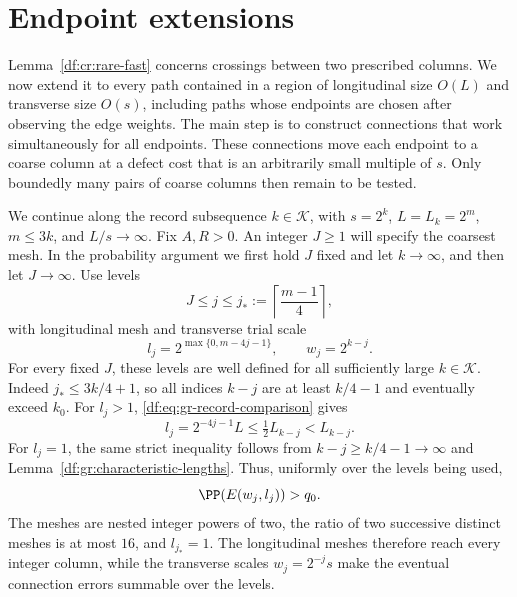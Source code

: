 \section{Endpoint extensions}\label{df:sec:grids}

Lemma~\ref{df:cr:rare-fast} concerns crossings between two prescribed
columns. We now extend it to every path contained in a region of
longitudinal size $O(L)$ and transverse size $O(s)$, including paths
whose endpoints are chosen after observing the edge weights. The main
step is to construct connections that work simultaneously for all
endpoints. These connections move each endpoint to a coarse column at
a defect cost that is an arbitrarily small multiple of $s$. Only
boundedly many pairs of coarse columns then remain to be tested.

We continue along the record subsequence $k\in\mathcal K$, with
$s=2^k$, $L=L_k=2^m$, $m\le3k$, and $L/s\to\infty$. Fix $A,R>0$.
An integer $J\ge1$ will specify the coarsest mesh. In the probability
argument we first hold $J$ fixed and let $k\to\infty$, and then let
$J\to\infty$. Use levels
\[
 J\leq j\leq j_*:=\left\lceil\frac{m-1}{4}\right\rceil,
\]
with longitudinal mesh and transverse trial scale
\begin{equation}\label{df:eq:gr-meshes}
 l_j=2^{\max\{0,m-4j-1\}},\qquad w_j=2^{k-j}.
\end{equation}
For every fixed $J$, these levels are well defined for all sufficiently
large $k\in\mathcal K$. Indeed $j_*\leq3k/4+1$, so all indices $k-j$
are at least $k/4-1$ and eventually exceed $k_0$. For $l_j>1$,
\eqref{df:eq:gr-record-comparison} gives
\[
 l_j=2^{-4j-1}L\leq\tfrac12L_{k-j}<L_{k-j}.
\]
For $l_j=1$, the same strict inequality follows from
$k-j\geq k/4-1\to\infty$ and
Lemma~\ref{df:gr:characteristic-lengths}. Thus, uniformly over the levels
being used,
\begin{equation}\label{df:eq:gr-trial-probability}
 \PP(E(w_j,l_j))>q_0.
\end{equation}
The meshes are nested integer powers of two, the ratio of two
successive distinct meshes is at most $16$, and $l_{j_*}=1$.
The longitudinal meshes therefore reach every integer column, while
the transverse scales $w_j=2^{-j}s$ make the eventual connection
errors summable over the levels.

